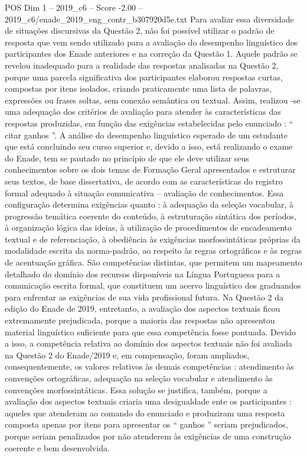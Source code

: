 \begin{textsample}{POS Dim 1 – 2019\_c6 – Score -2.00 – 2019\_c6/enade\_2019\_eng\_contr\_b307920d5e.txt}
Para avaliar essa diversidade de situações discursivas da Questão 2, não foi possível utilizar o padrão de resposta que vem sendo utilizado para a avaliação do desempenho linguístico dos participantes dos Enade anteriores e na correção da Questão 1.
Aquele padrão se revelou inadequado para a realidade das respostas analisadas na Questão 2, porque uma parcela significativa dos participantes elaborou respostas curtas, compostas por itens isolados, criando praticamente uma lista de palavras, expressões ou frases soltas, sem conexão semântica ou textual.
Assim, realizou -se uma adequação dos critérios de avaliação para atender às características das respostas produzidas, em função das exigências estabelecidas pelo enunciado : “ citar ganhos ”.
A análise do desempenho linguístico esperado de um estudante que está concluindo seu curso superior e, devido a isso, está realizando o exame do Enade, tem se pautado no princípio de que ele deve utilizar seus conhecimentos sobre os dois temas de Formação Geral apresentados e estruturar seus textos, de base dissertativa, de acordo com as características do registro formal adequado à situação comunicativa – avaliação de conhecimentos.
Essa configuração determina exigências quanto : à adequação da seleção vocabular, à progressão temática coerente do conteúdo, à estruturação sintática dos períodos, à organização lógica das ideias, à utilização de procedimentos de encadeamento textual e de referenciação, à obediência às exigências morfossintáticas próprias da modalidade escrita da norma-padrão, ao respeito às regras ortográficas e às regras de acentuação gráfica.
São competências distintas, que permitem um mapeamento detalhado do domínio dos recursos disponíveis na Língua Portuguesa para a comunicação escrita formal, que constituem um acervo linguístico dos graduandos para enfrentar as exigências de sua vida profissional futura.
Na Questão 2 da edição do Enade de 2019, entretanto, a avaliação dos aspectos textuais ficou extremamente prejudicada, porque a maioria das respostas não apresentou material linguístico suficiente para que essa competência fosse pontuada.
Devido a isso, a competência relativa ao domínio dos aspectos textuais não foi avaliada na Questão 2 do Enade/2019 e, em compensação, foram ampliados, consequentemente, os valores relativos às demais competências : atendimento às convenções ortográficas, adequação na seleção vocabular e atendimento às convenções morfossintáticas.
Essa solução se justifica, também, porque a avaliação dos aspectos textuais criaria uma desigualdade ente os participantes : aqueles que atenderam ao comando do enunciado e produziram uma resposta composta apenas por itens para apresentar os “ ganhos ” seriam prejudicados, porque seriam penalizados por não atenderem às exigências de uma construção coerente e bem desenvolvida.

\end{textsample}
